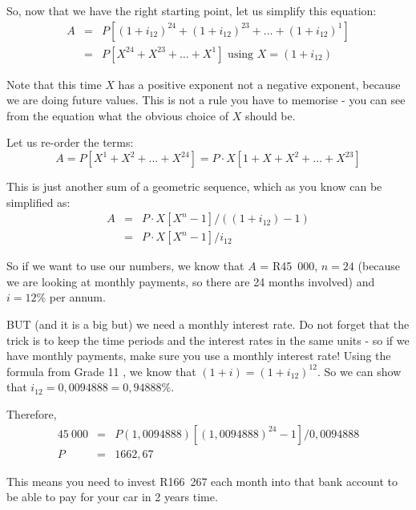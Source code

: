 So, now that we have the right starting point, let us simplify this equation:
\begin{eqnarray*}
A &=& P[(1+i_{12})^{24} + (1+i_{12})^{23} + \ldots + (1+i_{12})^{1}]\\
&=& P [ X^{24} + X^{23} + \ldots + X^1] \mbox{ using $X=(1+i_{12})$}
\end{eqnarray*}

Note that this time $X$ has a positive exponent not a negative exponent, because we are doing future values. This is not a rule you have to memorise - you can see from the equation what the obvious choice of $X$ should be.

Let us re-order the terms:
\begin{equation*}
A = P [ X^1 + X^2 + \ldots + X^{24}] = P \cdot X [1 + X + X^2 + \ldots + X^{23}]
\end{equation*}

This is just another sum of a geometric sequence, which as you know can be simplified as:
\begin{eqnarray*}
A &=& P \cdot X [X^n - 1] / ((1+i_{12})-1)\\
&=& P \cdot X [X^n - 1] / i_{12}
\end{eqnarray*}

So if we want to use our numbers, we know that $A$ = R45~000, $n=24$ (because we are looking at monthly payments, so there are 24 months involved) and $i = 12\%$ per annum.

BUT (and it is a big but) we need a monthly interest rate. Do not forget that the trick is to keep the time periods and the interest rates in the same units - so if we have monthly payments, make sure you use a monthly interest rate! Using the formula from Grade 11%
, we know that $(1+i) = (1+i_{12})^{12}$. So we can show that $i_{12} = 0,0094888 = 0,94888 \%$. 

Therefore,
\begin{eqnarray*}
45~000 &=& P (1,0094888) [(1,0094888)^{24} - 1] / 0,0094888\\
P&=&1 662,67
\end{eqnarray*}

This means you need to invest R166~267 each month into that bank account to be able to pay for your car in 2 years time.


